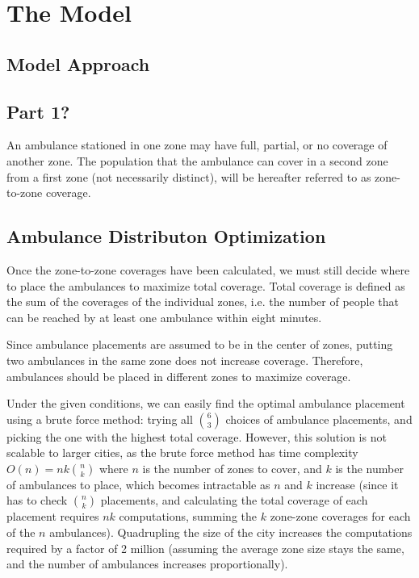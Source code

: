 \documentclass[notitlepage, 12pt]{article}
\begin{document}
\section{The Model}

\subsection{Model Approach}

\subsection{Part 1?}
An ambulance stationed in one zone may have full, partial, or no coverage of another zone. The population
that the ambulance can cover in a second zone from a first zone (not necessarily distinct), will be hereafter referred to as
zone-to-zone coverage.

\subsection{Ambulance Distributon Optimization}
Once the zone-to-zone coverages have been calculated, we must still decide where to place
the ambulances to maximize total coverage. Total coverage is defined as the sum of the coverages
of the individual zones, i.e. the number of people that can be reached by at least one ambulance
within eight minutes.

Since ambulance placements are assumed to be in the center of zones, putting two ambulances in the same
zone does not increase coverage. Therefore, ambulances should be placed in different zones to maximize
coverage.

Under the given conditions, we can easily find the optimal ambulance placement using a brute force
method: trying all $\binom{6}{3}$ choices of ambulance placements, and picking the one with the highest total coverage.
However, this solution is not scalable to larger cities, as the brute force method has time complexity
$O(n) = nk\binom{n}{k}$ where $n$ is the number of zones to cover, and $k$ is the number of ambulances to place, which
becomes intractable as $n$ and $k$ increase (since it has to check $\binom{n}{k}$ placements,
and calculating the total coverage of each placement requires $nk$ computations, summing the $k$ zone-zone
coverages for each of the $n$ ambulances). Quadrupling the size of the city
increases the computations required by a factor of 2 million (assuming the average zone size stays the same,
and the number of ambulances increases proportionally).
\end{document}
